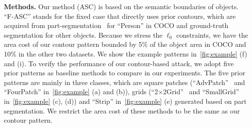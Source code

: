 \documentclass[times,twocolumn,final,authoryear]{elsarticle}
\newcommand{\revise}[1]{{\color{black}{#1}}}
\begin{document}
\textbf{Methods.} Our method (ASC) is based on the semantic boundaries of objects. ``F-ASC'' stands for the fixed case that directly uses prior contours, which are acquired from part-segmentation~\citep{lin2020cross} for ``Person'' in COCO and ground-truth segmentation for other objects. 
Because we stress the $\ell_0$ constraints, we have the area cost of our contour pattern bounded by 5\% of the object area in COCO and 10\% in the other two datasets. We show the example patterns in~\cref{fig:example} (f) and (i). 
To verify the performance of our contour-based attack, we adopt five prior patterns as baseline methods to compare in our experiments. 
The five prior patterns are mainly in three classes, which are square patches (``AdvPatch''~\citep{thys2019fooling} and ``FourPatch'' in~\cref{fig:example} (a) and (b)), grids (``2$\times$2Grid''~\citep{wu2020dpattack} and ``SmallGrid'' in~\cref{fig:example} (c), (d)) and ``Strip'' in~\cref{fig:example} (e) generated based on part segmentation. 
We restrict the area cost of these methods to be the same as our contour pattern. \revise{Note that all methods including our proposed ASC optimize the texture via gradient-based method, which involves iterative forward inference and backward propagation, the contour acquisition for ASC with segmentation model only needs one forward inference and brings negligible extra computation under our unified attack framework.}
\end{document}
